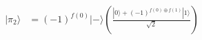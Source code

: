 \documentclass[preview]{standalone}
\begin{document}
\begin{align*}
|\pi_2\rangle &= (-1)^{f(0)}|-\rangle \left( \frac{|0\rangle + (-1)^{f(0)\oplus f(1)} |1\rangle}{\sqrt{2}}\right)
\end{align*}
\end{document}
